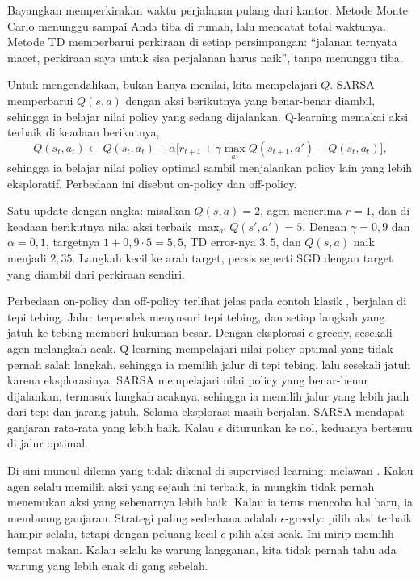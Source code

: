 Bayangkan memperkirakan waktu perjalanan pulang dari kantor. Metode Monte Carlo menunggu sampai Anda
tiba di rumah, lalu mencatat total waktunya. Metode TD memperbarui perkiraan di setiap persimpangan:
``jalanan ternyata macet, perkiraan saya untuk sisa perjalanan harus naik'', tanpa menunggu tiba.

Untuk mengendalikan, bukan hanya menilai, kita mempelajari $Q$. SARSA memperbarui $Q(s,a)$ dengan aksi
berikutnya yang benar-benar diambil, sehingga ia belajar nilai policy yang sedang dijalankan.
Q-learning \citep{watkins1992} memakai aksi terbaik di keadaan berikutnya,
\begin{equation}
Q(s_t,a_t)\leftarrow Q(s_t,a_t)+\alpha\big[r_{t+1}+\gamma\max_{a'}Q(s_{t+1},a')-Q(s_t,a_t)\big],
\end{equation}
sehingga ia belajar nilai policy optimal sambil menjalankan policy lain yang lebih eksploratif.
Perbedaan ini disebut on-policy dan off-policy.

Satu update dengan angka: misalkan $Q(s,a)=2$, agen menerima $r=1$, dan di keadaan berikutnya nilai aksi terbaik
$\max_{a'}Q(s',a')=5$. Dengan $\gamma=0{,}9$ dan $\alpha=0{,}1$, targetnya $1+0{,}9\cdot5=5{,}5$, TD error-nya $3{,}5$, dan
$Q(s,a)$ naik menjadi $2{,}35$. Langkah kecil ke arah target, persis seperti SGD dengan target yang diambil dari
perkiraan sendiri.

Perbedaan on-policy dan off-policy terlihat jelas pada contoh klasik \citet{sutton2018}, berjalan di tepi tebing.
Jalur terpendek menyusuri tepi tebing, dan setiap langkah yang jatuh ke tebing memberi hukuman besar. Dengan eksplorasi
$\epsilon$-greedy, sesekali agen melangkah acak. Q-learning mempelajari nilai policy optimal yang tidak pernah salah
langkah, sehingga ia memilih jalur di tepi tebing, lalu sesekali jatuh karena eksplorasinya. SARSA mempelajari nilai
policy yang benar-benar dijalankan, termasuk langkah acaknya, sehingga ia memilih jalur yang lebih jauh dari tepi dan
jarang jatuh. Selama eksplorasi masih berjalan, SARSA mendapat ganjaran rata-rata yang lebih baik. Kalau $\epsilon$
diturunkan ke nol, keduanya bertemu di jalur optimal.

Di sini muncul dilema yang tidak dikenal di supervised learning:  melawan
. Kalau agen selalu memilih aksi yang sejauh ini terbaik, ia mungkin tidak pernah
menemukan aksi yang sebenarnya lebih baik. Kalau ia terus mencoba hal baru, ia membuang ganjaran.
Strategi paling sederhana adalah $\epsilon$-greedy: pilih aksi terbaik hampir selalu, tetapi dengan
peluang kecil $\epsilon$ pilih aksi acak. Ini mirip memilih tempat makan. Kalau selalu ke warung
langganan, kita tidak pernah tahu ada warung yang lebih enak di gang sebelah.

